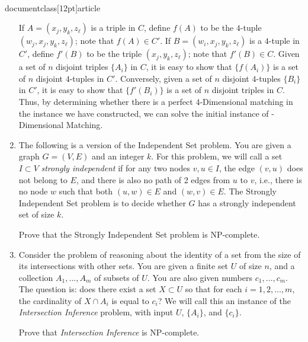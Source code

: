 \\documentclass[12pt]{article}
\begin{document}
\begin{enumerate}
{If $A = (x_j,y_k,z_\ell)$ is a triple in $C$, define $f(A)$ to be 
the $4$-tuple $(w_j,x_j, y_k, z_\ell)$; note that $f(A) \in C'$.
If $B = (w_i, x_j, y_k, z_\ell)$ is a $4$-tuple in $C'$,
define $f'(B)$ to be the triple $(x_j,y_k,z_\ell)$; note that $f'(B) \in C$.
Given a set of $n$ disjoint triples $\{A_i\}$ in $C$,
it is easy to show that $\{f(A_i)\}$ is a set of $n$ disjoint 
$4$-tuples in $C'$.
Conversely, given a set of $n$ disjoint $4$-tuples $\{B_i\}$
in $C'$, it is easy to show that $\{f'(B_i)\}$ is a set of $n$ disjoint 
triples in $C$.
Thus, by determining whether there is a perfect $4$-Dimensional
matching in the instance we have constructed, we can solve
the initial instance of {-Dimensional Matching}.

}


\item 

The following is a version of the {\sc Independent Set}
problem. You are given a graph $G=(V,E)$ and an integer $k$. For this
problem, we will call a set $I \subset V$ {\em strongly independent}
if for any two nodes $v,u \in I$, the edge $(v,u)$ does not
belong to $E$, and there is also no path of 2 edges from $u$ to $v$,
i.e., there is no node $w$ such that both $(u,w) \in E$ and $(w,v)\in E$.
The {\sc Strongly Independent Set} problem is to decide whether $G$ has a
strongly independent set of size $k$.

Prove that the {\sc Strongly Independent Set} problem is NP-complete.




\item 

Consider the problem of reasoning about the identity of
a set from the size of its intersections with other sets.
You are given a finite set $U$ of size $n$, and
a collection $A_1, \ldots, A_m$ of subsets of $U$.
You are also given numbers $c_1, \ldots, c_m$.
The question is: does there exist a set $X \subset U$
so that for each $i = 1, 2, \ldots, m$,
the cardinality of $X \cap A_i$ is equal to $c_i$?
We will call this an instance of the
{\em Intersection Inference} problem,
with input $U$, $\{A_i\}$, and $\{c_i\}$.

Prove that {\em Intersection Inference} is NP-complete.




\end{enumerate}
\end{document}
